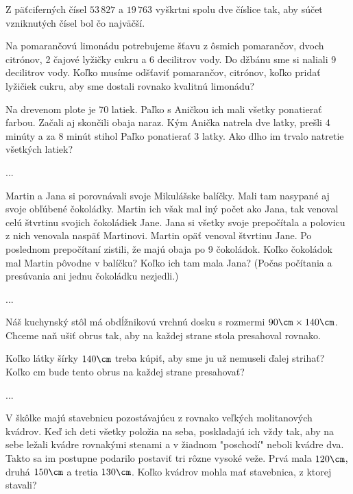 ﻿{%
Z päťciferných čísel $53\,827$ a $19\,763$ vyškrtni spolu dve číslice tak, aby súčet vzniknutých
čísel bol čo najväčší.}

{%
Na pomarančovú limonádu potrebujeme šťavu z ôsmich pomarančov, dvoch citrónov, 2 čajové
lyžičky cukru a 6 decilitrov vody. Do džbánu sme si naliali 9 decilitrov vody. Koľko
musíme odšťaviť pomarančov, citrónov, koľko pridať lyžičiek cukru, aby sme dostali rovnako
kvalitnú limonádu?}

{%
Na drevenom plote je 70 latiek. Paľko s Aničkou ich mali všetky ponatierať farbou. Začali aj
skončili obaja naraz. Kým Anička natrela dve latky, prešli 4 minúty a za 8 minút stihol Paľko
ponatierať 3 latky. Ako dlho im trvalo natretie všetkých latiek?}

{%
...}

{%
Martin a Jana si porovnávali svoje Mikulášske balíčky. Mali tam nasypané aj svoje obľúbené
čokoládky. Martin ich však mal iný počet ako Jana, tak venoval celú štvrtinu svojich
čokoládiek Jane. Jana si všetky svoje prepočítala a polovicu z nich venovala naspäť
Martinovi. Martin opäť venoval štvrtinu Jane. Po poslednom prepočítaní zistili, že majú obaja
po 9 čokoládok. Koľko čokoládok mal Martin pôvodne v balíčku? Koľko ich tam mala Jana?
(Počas počítania a presúvania ani jednu čokoládku nezjedli.)}

{%
...}

{%
Náš kuchynský stôl má obdĺžnikovú vrchnú dosku s rozmermi $90\cm\times140\cm$. Chceme naň
ušiť obrus tak, aby na každej strane stola presahoval rovnako.
\begin{itemize}
 Koľko látky šírky $140\cm$ treba kúpiť, aby sme ju už nemuseli ďalej strihať?
 Koľko cm bude tento obrus na každej strane presahovať?
\end{itemize}
}

{%
...}

{%
V škôlke majú stavebnicu pozostávajúcu z rovnako veľkých molitanových kvádrov. Keď ich
deti všetky položia na seba, poskladajú ich vždy tak, aby na sebe ležali kvádre rovnakými
stenami a v žiadnom "poschodí" neboli kvádre dva. Takto sa im postupne podarilo postaviť tri
rôzne vysoké veže. Prvá mala $120\cm$, druhá $150\cm$ a tretia $130\cm$. Koľko kvádrov mohla
mať stavebnica, z ktorej stavali?}

